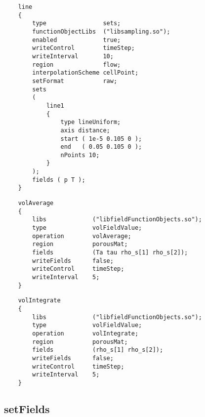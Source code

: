 \documentclass[a4paper, 12pt]{article}
\numberwithin{equation}{section}
\begin{document}
    \begin{minipage}{\textwidth}
    \vspace{12pt}
    {
    \begin{verbatim}
    line
    {
        type                sets;
        functionObjectLibs  ("libsampling.so");
        enabled             true;
        writeControl        timeStep;
        writeInterval       10;
        region              flow;
        interpolationScheme cellPoint;
        setFormat           raw;
        sets
        (
            line1
            {
                type lineUniform;
                axis distance;
                start ( 1e-5 0.105 0 );
                end   ( 0.05 0.105 0 );
                nPoints 10;
            }
        );
        fields ( p T );
    }
    \end{verbatim}
    }
    \end{minipage}

    \begin{minipage}{\textwidth}
    \vspace{12pt}
    {
    \begin{verbatim}
    volAverage
    {
        libs             ("libfieldFunctionObjects.so");
        type             volFieldValue;
        operation        volAverage;
        region           porousMat;
        fields           (Ta tau rho_s[1] rho_s[2]);
        writeFields      false;
        writeControl     timeStep;
        writeInterval    5;
    }
    \end{verbatim}
    }
    \end{minipage}

    \begin{minipage}{\textwidth}
    \vspace{12pt}
    {
    \begin{verbatim}
    volIntegrate
    {
        libs             ("libfieldFunctionObjects.so");
        type             volFieldValue;
        operation        volIntegrate;
        region           porousMat;
        fields           (rho_s[1] rho_s[2]);
        writeFields      false;
        writeControl     timeStep;
        writeInterval    5;
    }
    \end{verbatim}
    }
    \end{minipage}

    \subsection{setFields}
\end{document}
